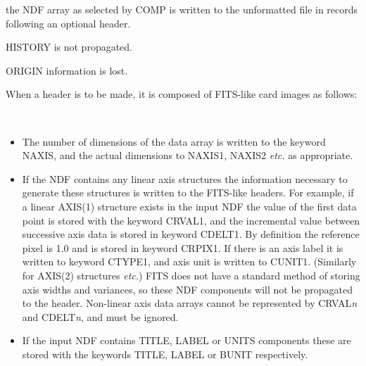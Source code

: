 \documentclass[twoside,11pt]{article}
\newcommand{\latex}[1]{#1}
\newcommand{\ssthitemlist}[1]{
  \latex{
  \mbox{} \\
  \vspace{-3.5ex}
  }
  \begin{itemize}
     #1
  \end{itemize}
}
\newcommand{\sstitem}{\item}
\newcommand{\sstitem}{\item}
\begin{document}
{{{         \sstitem
            the NDF array as selected by COMP is written to the
            unformatted file in records following an optional header.

         \sstitem
            HISTORY is not propagated.

         \sstitem
            ORIGIN information is lost.

         \sstitem
            When a header is to be made, it is composed of FITS-like card
            images as follows:
      
         \ssthitemlist{

            \sstitem
               The number of dimensions of the data array is written
               to the keyword NAXIS, and the actual dimensions to NAXIS1,
               NAXIS2 {\it etc.} as appropriate.

            \sstitem
               If the NDF contains any linear axis structures the
               information necessary to generate these structures is
               written to the FITS-like headers. For example, if a linear
               AXIS(1) structure exists in the input NDF the value of the
               first data point is stored with the keyword CRVAL1,
               and the incremental value between successive axis data is
               stored in keyword CDELT1.  By definition the reference pixel is
               1.0 and is stored in keyword CRPIX1.  If there is an axis label
               it is written to keyword CTYPE1, and axis unit is written to CUNIT1.
               (Similarly for AXIS(2) structures {\it etc.}) FITS does not have
               a standard method of storing axis widths and variances, so these
               NDF components will not be propagated to the header.
               Non-linear axis data arrays cannot be represented by CRVAL{\em{n}}
               and CDELT{\em{n}}, and must be ignored.

            \sstitem
               If the input NDF contains TITLE, LABEL or UNITS components
               these are stored with the keywords TITLE, LABEL or BUNIT
               respectively.

}}}}
\end{document}
